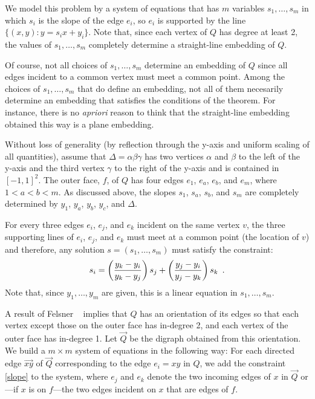 \documentclass{patmorin}
\begin{document}
We model this problem by a system of equations that has $m$ variables
$s_1,\ldots,s_m$ in which $s_i$ is the slope of the edge $e_i$, so $e_i$
is supported by the line $\{(x,y):y=s_ix + y_i\}$.  Note that, since
each vertex of $Q$ has degree at least 2, the values of $s_1,\ldots,s_m$
completely determine a straight-line embedding of $Q$.

Of course, not all choices of $s_1,\ldots,s_m$ determine an embedding of
$Q$ since all edges incident to a common vertex must meet a common point.
Among the choices of $s_1,\ldots,s_m$ that do define an embedding, not all
of them necesarily determine an embedding that satisfies the conditions
of the theorem. For instance, there is no \emph{apriori} reason to think
that the straight-line embedding obtained this way is a plane embedding.

Without loss of generality (by reflection through the y-axis and uniform
scaling of all quantities), assume that $\Delta=\alpha\beta\gamma$
has two vertices $\alpha$ and $\beta$ to the left of the y-axis and
the third vertex $\gamma$ to the right of the y-axis and is contained
in $[-1,1]^2$.  The outer face, $f$, of $Q$ has four edges $e_1$, $e_a$,
$e_b$, and $e_m$, where $1 < a < b < m$.  As discussed above, the slopes
$s_1$, $s_a$, $s_b$, and $s_m$ are completely determined by $y_1$, $y_a$,
$y_b$, $y_c$, and $\Delta$.

For every three edges $e_i$, $e_j$, and $e_k$ incident on the same
vertex $v$, the three supporting lines of $e_i$, $e_j$, and $e_k$ must
meet at a common point (the location of $v$) and therefore, any solution
$s=(s_1,\ldots,s_m)$ must satisfy the constraint:
\begin{equation}\eqlabel{slope} 
    s_i = \left(\frac{y_k-y_i}{y_k-y_j}\right) s_j 
          + \left(\frac{y_j-y_i}{y_j-y_k}\right)s_k \enspace .
\end{equation}
Note that, since $y_1,\ldots,y_m$ are given, this is a linear equation
in $s_1,\ldots,s_m$.

A result of Felsner \etal\ \cite[Lemma~2.7]{felsner.huemer.ea:binary}
implies that $Q$ has an orientation of its edges so that each vertex
except those on the outer face has in-degree 2, and each vertex of
the outer face has in-degree 1.  Let $\vec{Q}$ be the digraph obtained
from this orientation. We build a $m\times m$ system of equations in
the following way: For each directed edge $\vec{xy}$ of $\vec{Q}$
corresponding to the edge $e_i=xy$ in $Q$, we add the constraint
\eqref{slope} to the system, where $e_j$ and $e_k$ denote the two incoming
edges of $x$ in $\vec{Q}$ or---if $x$ is on $f$---the two edges incident
on $x$ that are edges of $f$.
\end{document}

